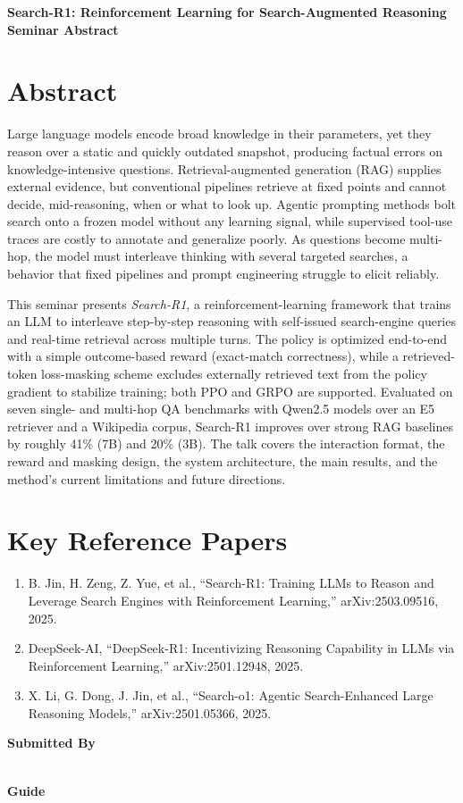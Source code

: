 \documentclass[11pt]{article}
\begin{document}
\begin{center}
{\LARGE\bfseries Search-R1: Reinforcement Learning for Search-Augmented Reasoning}\\[1.1em]
{\large\bfseries Seminar Abstract}\\[0.6em]
{\normalsize \seminarDate}
\end{center}
\vspace{0.6em}
\section*{Abstract}
Large language models encode broad knowledge in their parameters, yet they reason over a static and quickly outdated snapshot, producing factual errors on knowledge-intensive questions. Retrieval-augmented generation (RAG) supplies external evidence, but conventional pipelines retrieve at fixed points and cannot decide, mid-reasoning, when or what to look up. Agentic prompting methods bolt search onto a frozen model without any learning signal, while supervised tool-use traces are costly to annotate and generalize poorly. As questions become multi-hop, the model must interleave thinking with several targeted searches, a behavior that fixed pipelines and prompt engineering struggle to elicit reliably.

This seminar presents \emph{Search-R1}, a reinforcement-learning framework that trains an LLM to interleave step-by-step reasoning with self-issued search-engine queries and real-time retrieval across multiple turns. The policy is optimized end-to-end with a simple outcome-based reward (exact-match correctness), while a retrieved-token loss-masking scheme excludes externally retrieved text from the policy gradient to stabilize training; both PPO and GRPO are supported. Evaluated on seven single- and multi-hop QA benchmarks with Qwen2.5 models over an E5 retriever and a Wikipedia corpus, Search-R1 improves over strong RAG baselines by roughly 41\% (7B) and 20\% (3B). The talk covers the interaction format, the reward and masking design, the system architecture, the main results, and the method's current limitations and future directions.
\section*{Key Reference Papers}
\begin{enumerate}
  \item B. Jin, H. Zeng, Z. Yue, et al., ``Search-R1: Training LLMs to Reason and Leverage Search Engines with Reinforcement Learning,'' arXiv:2503.09516, 2025.
  \item DeepSeek-AI, ``DeepSeek-R1: Incentivizing Reasoning Capability in LLMs via Reinforcement Learning,'' arXiv:2501.12948, 2025.
  \item X. Li, G. Dong, J. Jin, et al., ``Search-o1: Agentic Search-Enhanced Large Reasoning Models,'' arXiv:2501.05366, 2025.
\end{enumerate}
\vspace{0.8em}
\noindent\textbf{Submitted By}\\
\seminarName\\
\seminarRoll

\vspace{0.6em}
\noindent\textbf{Guide}\\
\seminarGuide
\end{document}
